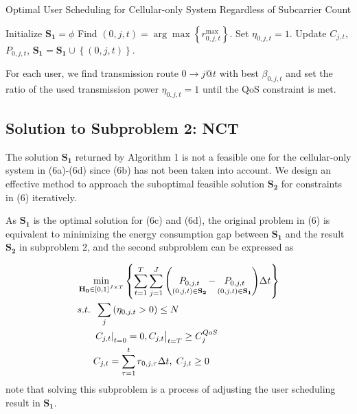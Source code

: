 \documentclass{ieeeaccess}
\begin{document}
\begin{algorithm}[h]
\caption{Optimal User Scheduling for Cellular-only System Regardless of Subcarrier Count}
\label{alg:1}
\begin{algorithmic}[1]
\STATE Initialize ${{\mathbf{S}}_{\mathbf{1}}}=\phi$
    \STATE Find $\left( {0,j,t} \right) = \arg \max \left\{ {r_{0,j,t}^{\max }} \right\}$.
    \STATE Set ${\eta _{0,j,t}} = 1$.
    \STATE Update ${C_{j,t}}$, ${P_{0,j,t}}$, ${{\mathbf{S}}_{\mathbf{1}}}={{\mathbf{S}}_{\mathbf{1}}} \cup \left\{ {\left( {0,j,t} \right)} \right\}$.
  \ENDWHILE
\ENDFOR
\end{algorithmic}
\end{algorithm}

For each user, we find transmission route $0 \to j@t$ with best ${\beta _{0,j,t}}$ and set the ratio of the used transmission power ${\eta _{0,j,t} = 1}$ until the QoS constraint is met.


\subsection{Solution to \textbf{Subproblem 2: NCT}}

The solution ${{\mathbf{S}}_{\mathbf{1}}}$ returned by Algorithm 1 is not a feasible one for the cellular-only system in (6a)-(6d) since (6b) has not been taken into account. We design an effective method to approach the suboptimal feasible solution ${{\mathbf{S}}_{\mathbf{2}}}$ for constraints in (6) iteratively.

As ${{\mathbf{S}}_{\mathbf{1}}}$ is the optimal solution for (6c) and (6d), the original problem in (6) is equivalent to minimizing the energy consumption gap between ${{\mathbf{S}}_{\mathbf{1}}}$ and the result ${{\mathbf{S}}_{\mathbf{2}}}$ in subproblem 2, and the second subproblem can be expressed as

\begin{subequations}
\begin{align}
& \mathop {\min }\limits_{{{\mathbf{{\rm H}}}_{\mathbf{0}}} \in {{\left[ {0,1} \right]}^{J \times T}}} \left\{ {\sum\limits_{t = 1}^T {\sum\limits_{j = 1}^J {\left( {\mathop {{P_{0,j,t}}}\limits_{\left( {0,j,t} \right) \in {{\mathbf{S}}_{\mathbf{2}}}}  - \mathop {{P_{0,j,t}}}\limits_{\left( {0,j,t} \right) \in {{\mathbf{S}}_{\mathbf{1}}}} } \right)} \Delta t} } \right\} \\
& {s.t.} \;\; \sum\limits_j  {\left( {{\eta _{0,j,t}} > 0} \right)}  \le N \\
& \;\;\;\;\;\; {\left. {{{\left. {{C_{j,t}}} \right|}_{t = 0}} = 0, {C_{j,t}}} \right|_{t = T}} \ge C_j^{QoS} \\
& \;\;\;\;\;\; {C_{j,t}} = \sum\limits_{\tau  = 1}^t {{r_{0,j,\tau }}\Delta t} ,\; {C_{j,t}} \ge 0
\end{align}
\end{subequations}
note that solving this subproblem is a process of adjusting the user scheduling result in ${{\mathbf{S}}_{\mathbf{1}}}$.
\end{document}
